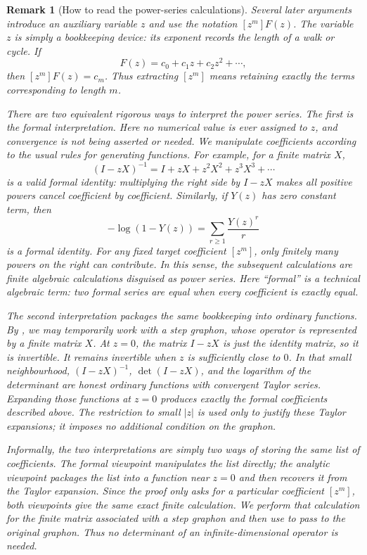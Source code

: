 \documentclass[11pt]{article}
\newtheorem{remark}[theorem]{Remark}
\begin{document}
\begin{remark}[How to read the power-series calculations]
Several later arguments introduce an auxiliary variable \(z\) and use the
notation \([z^m]F(z)\).  The variable \(z\) is simply a bookkeeping device:
its exponent records the length of a walk or cycle.  If
\[
       F(z)=c_0+c_1z+c_2z^2+\cdots,
\]
then \([z^m]F(z)=c_m\).  Thus extracting \([z^m]\) means retaining exactly
the terms corresponding to length \(m\).

There are two equivalent rigorous ways to interpret the power series.  The
first is the \emph{formal} interpretation.  Here no numerical value is ever
assigned to \(z\), and convergence is not being asserted or needed.  We
manipulate coefficients according to the usual rules for generating
functions.  For example, for a finite matrix \(X\),
\[
       (I-zX)^{-1}=I+zX+z^2X^2+z^3X^3+\cdots
\]
is a valid formal identity: multiplying the right side by \(I-zX\) makes
all positive powers cancel coefficient by coefficient.  Similarly, if
\(Y(z)\) has zero constant term, then
\[
       -\log(1-Y(z))
       =\sum_{r\ge1}\frac{Y(z)^r}{r}
\]
is a formal identity.  For any fixed target coefficient \([z^m]\), only
finitely many powers on the right can contribute.  In this sense, the
subsequent calculations are finite algebraic calculations disguised as
power series.  Here ``formal'' is a technical algebraic term: two formal
series are equal when every coefficient is exactly equal.  

The second interpretation packages the same bookkeeping into ordinary
functions.  By , we may temporarily work with a
step graphon, whose operator is represented by a finite matrix \(X\).  At
\(z=0\), the matrix \(I-zX\) is just the identity matrix, so it is invertible.
It remains invertible when \(z\) is sufficiently close to \(0\).  In that
small neighbourhood, \((I-zX)^{-1}\), \(\det(I-zX)\), and the logarithm of
the determinant are honest ordinary functions with convergent Taylor
series.  Expanding those functions at \(z=0\) produces exactly the formal
coefficients described above.  The restriction to small \(|z|\) is used
only to justify these Taylor expansions; it imposes no additional condition
on the graphon.

Informally, the two interpretations are simply two ways of storing the same
list of coefficients.  The formal viewpoint manipulates the list directly;
the analytic viewpoint packages the list into a function near \(z=0\) and
then recovers it from the Taylor expansion.  Since the proof only asks for a
particular coefficient \([z^m]\), both viewpoints give the same exact finite
calculation.  We perform that calculation for the finite matrix associated
with a step graphon and then use  to pass to the
original graphon.  Thus no determinant of an infinite-dimensional operator
is needed.
\end{remark}
\end{document}
